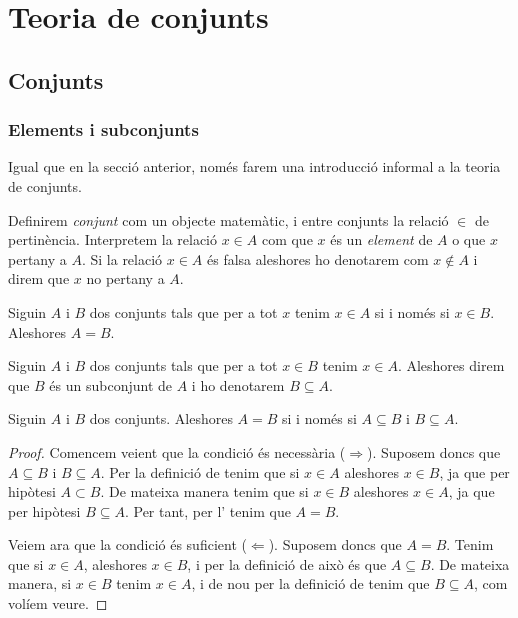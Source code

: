 \documentclass[../Apunts.tex]{subfiles}
\begin{document}
	\chapter{Teoria de conjunts}
	\section{Conjunts}
	\subsection{Elements i subconjunts}
	Igual que en la secció anterior, només farem una introducció informal a la teoria de conjunts.
	
	Definirem \emph{conjunt} com un objecte matemàtic, i entre conjunts la relació \(\in\) de pertinència. Interpretem la relació \(x\in A\) com que \(x\) és un \emph{element} de \(A\) o que \(x\) pertany a \(A\). Si la relació \(x\in A\) és falsa aleshores ho denotarem com \(x\notin A\) i direm que \(x\) no pertany a \(A\).
	\begin{axiom}
		\label{axiom:axioma d'extensionalitat}
		Siguin \(A\) i \(B\) dos conjunts tals que per a tot \(x\) tenim \(x\in A\) si i només si \(x\in B\). Aleshores \(A=B\).
	\end{axiom}
	\begin{definition}[Subconjunt]
		\label{def:subconjunt}
		Siguin \(A\) i \(B\) dos conjunts tals que per a tot \(x\in B\) tenim \(x\in A\). Aleshores direm que \(B\) és un subconjunt de \(A\) i ho denotarem \(B\subseteq A\).
	\end{definition}
	\begin{theorem}
		\label{thm:doble inclusió}
		Siguin \(A\) i \(B\) dos conjunts. Aleshores \(A=B\) si i només si \(A\subseteq B\) i \(B\subseteq A\).
		\begin{proof}
			Comencem veient que la condició és necessària (\(\Rightarrow\)). Suposem doncs que \(A\subseteq B\) i \(B\subseteq A\). Per la definició de  tenim que si \(x\in A\) aleshores \(x\in B\), ja que per hipòtesi \(A\subset B\). De mateixa manera tenim que si \(x\in B\) aleshores \(x\in A\), ja que per hipòtesi \(B\subseteq A\). Per tant, per l' tenim que \(A=B\).
			
			Veiem ara que la condició és suficient (\(\Leftarrow\)). Suposem doncs que \(A=B\). Tenim que si \(x\in A\), aleshores \(x\in B\), i per la definició de  això és que \(A\subseteq B\). De mateixa manera, si \(x\in B\) tenim \(x\in A\), i de nou per la definició de  tenim que \(B\subseteq A\), com volíem veure.
		\end{proof}
	\end{theorem}
\end{document}
